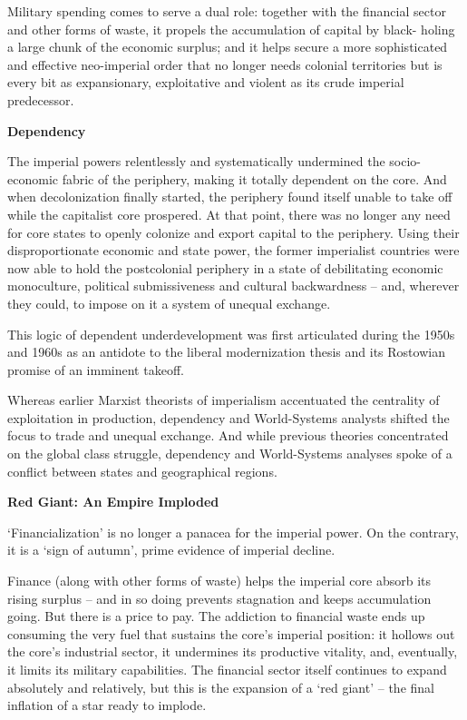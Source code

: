 \documentclass[
]{book}
\begin{document}
Military spending comes to serve a dual role: together with the
financial sector and other forms of waste, it propels the accumulation of capital by black-
holing a large chunk of the economic surplus; and it helps secure a more sophisticated
and effective neo-imperial order that no longer needs colonial territories but is every bit
as expansionary, exploitative and violent as its crude imperial predecessor.

\textbf{Dependency}

The imperial powers relentlessly and systematically
undermined the socio-economic fabric of the periphery, making it totally dependent on
the core. And when decolonization finally started, the periphery found itself unable to
take off while the capitalist core prospered.
At that
point, there was no longer any need for core states to openly colonize and export capital
to the periphery. Using their disproportionate economic and state power, the former
imperialist countries were now able to hold the postcolonial periphery in a state of
debilitating economic monoculture, political submissiveness and cultural backwardness
-- and, wherever they could, to impose on it a system of unequal exchange.

This logic of dependent underdevelopment was first articulated during the
1950s and 1960s as an antidote to the liberal modernization thesis and its Rostowian
promise of an imminent takeoff.

Whereas earlier Marxist
theorists of imperialism accentuated the centrality of exploitation in production,
dependency and World-Systems analysts shifted the focus to trade and unequal
exchange. And while previous theories concentrated on the global class struggle,
dependency and World-Systems analyses spoke of a conflict between states and
geographical regions.

\textbf{Red Giant: An Empire Imploded}

`Financialization' is no longer a panacea for the
imperial power. On the contrary, it is a `sign of autumn', prime evidence of imperial
decline.

Finance (along with other
forms of waste) helps the imperial core absorb its rising surplus -- and in so doing
prevents stagnation and keeps accumulation going. But there is a price to pay. The
addiction to financial waste ends up consuming the very fuel that sustains the core's
imperial position: it hollows out the core's industrial sector, it undermines its productive
vitality, and, eventually, it limits its military capabilities. The financial sector itself
continues to expand absolutely and relatively, but this is the expansion of a `red giant' --
the final inflation of a star ready to implode.
\end{document}
